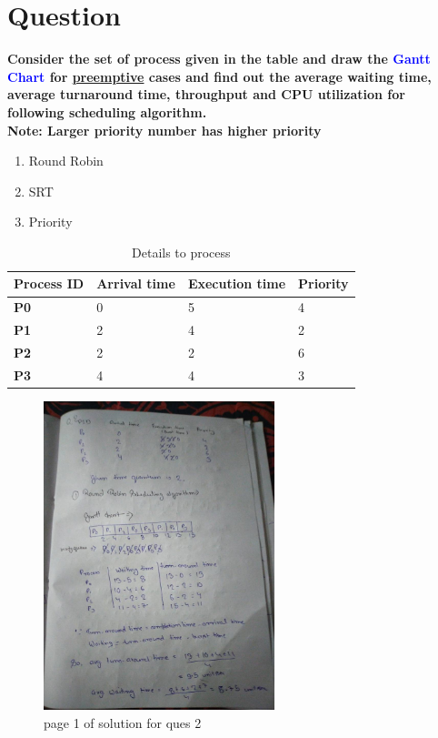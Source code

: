 \documentclass[11pt,a4paper,oneside]{article}
\begin{document}
\clearpage

\section{Question}
\bgroup \bfseries
\noindent Consider the set of process given in the table and draw the \textcolor{blue}{Gantt Chart} for \underline{preemptive} cases and find out the average waiting time, average turnaround time, throughput and CPU utilization for following scheduling algorithm.\\
Note: Larger priority number has higher priority

\begin{enumerate}[label=\alph*]
		\item Round Robin
		\item SRT
		\item Priority
\end{enumerate}
\egroup{}

\begin{center}
	\begin{table}[h]
		\begin{tabular}{ ||>{\bfseries} m{7em} || m{7em} || m{7em} || m{7em} ||}
			\hline
			Process ID & \bfseries{Arrival time} & \bfseries{Execution time} & \textbf{Priority} \\
			\hline
			P0 & 0 & 5 & 4 \\
			\hline
			P1 & 2 & 4 & 2 \\
			\hline
			P2 & 2 & 2 & 6 \\
			\hline
			P3 & 4 & 4 & 3 \\
			\hline
		\end{tabular}
		\caption{Details to process}
	\end{table}
\end{center}

\begin{figure}[hbt!]
	\centering
	\includegraphics[width=0.6\textwidth, angle=-90]{images/red_images/q2i1.jpg}
	\caption{page 1 of solution for ques 2}
\end{figure}
\end{document}
